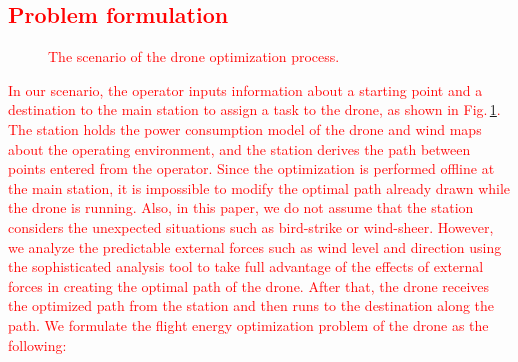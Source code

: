 \documentclass[journal]{./template/IEEEtran}
\begin{document}
\subsection{\textcolor{red}{Problem formulation}}

\begin{figure}[ht]
\caption{\textcolor{red}{The scenario of the drone optimization process.}}
\label{fig:problem_formulation}
\end{figure}

\textcolor{red}{In our scenario, the operator inputs information about a starting point and a destination to the main station to assign a task to the drone, as shown in Fig.\,\ref{fig:problem_formulation}.
The station holds the power consumption model of the drone and wind maps about the operating environment, and the station derives the path between points entered from the operator.
Since the optimization is performed offline at the main station, it is impossible to modify the optimal path already drawn while the drone is running. Also, in this paper, we do not assume that the station considers the unexpected situations such as bird-strike or wind-sheer.
However, we analyze the predictable external forces such as wind level and direction using the sophisticated analysis tool to take full advantage of the effects of external forces in creating the optimal path of the drone. 
After that, the drone receives the optimized path from the station and then runs to the destination along the path. We formulate the flight energy optimization problem of the drone as the following:}
\end{document}
